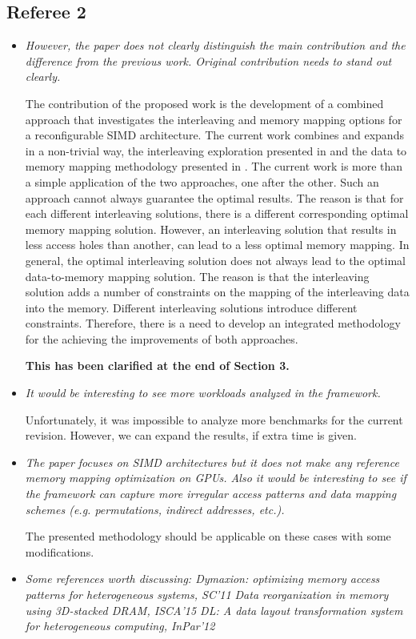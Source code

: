 \documentclass[12pt,a4paper,notitlepage]{article}
\begin{document}
\subsection*{Referee 2}

\begin{itemize}

\item \textit{However, the paper does not clearly distinguish the main contribution and 
the difference from the previous work. Original contribution needs to stand
out clearly.}

The contribution of the proposed work is the development of a combined approach that investigates the interleaving and memory mapping options for a reconfigurable SIMD architecture.  
The current work combines and expands in a non-trivial way, the interleaving exploration presented in \cite{sharma2013data} and the data to memory mapping methodology presented in \cite{filippopoulos2013exploration}. 
The current work is more than a simple application of the two approaches, one after the other.
Such an approach cannot always guarantee the optimal results.
The reason is that for each different interleaving solutions, there is a different corresponding optimal memory mapping solution.
However, an interleaving solution that results in less access holes than another, can lead to a less optimal memory mapping.
In general, the optimal interleaving solution does not always lead to the optimal data-to-memory mapping solution.
The reason is that the interleaving solution adds a number of constraints on the mapping of the interleaving data into the memory. 
Different interleaving solutions introduce different constraints. 
Therefore, there is a need to develop an integrated methodology for the achieving the improvements of both approaches.

\textbf{This has been clarified at the end of Section 3.}

\item \textit{It would be interesting to see more workloads analyzed in the framework.}

Unfortunately, it was impossible to analyze more benchmarks for the current revision. However, we can expand the results, if extra time is given.

\item \textit{The paper focuses on SIMD architectures but it does not make any reference memory mapping optimization on GPUs. Also it would be interesting to
see if the framework can capture more irregular access patterns and data mapping schemes (e.g. permutations, indirect addresses, etc.). }

The presented methodology should be applicable on these cases with some modifications.

\item \textit{Some references worth discussing:
Dymaxion: optimizing memory access patterns for heterogeneous systems, SC'11
Data reorganization in memory using 3D-stacked DRAM, ISCA'15
DL: A data layout transformation system for heterogeneous computing, InPar'12}



\end{itemize}
\end{document}
